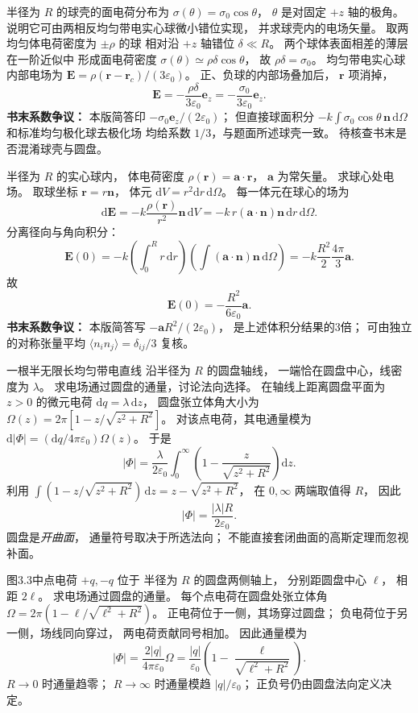 半径为 $R$ 的球壳的面电荷分布为
$\sigma(\theta)=\sigma_0\cos\theta$，
$\theta$ 是对固定 $+z$ 轴的极角。
说明它可由两相反均匀带电实心球微小错位实现，
并求球壳内的电场矢量。
\exsolution
取两均匀体电荷密度为 $\pm\rho$ 的球
相对沿 $+z$ 轴错位 $\delta\ll R$。
两个球体表面相差的薄层在一阶近似中
形成面电荷密度
$\sigma(\theta)\simeq\rho\delta\cos\theta$，
故 $\rho\delta=\sigma_0$。
均匀带电实心球内部电场为
$\bm E=\rho(\bm r-\bm r_c)/(3\varepsilon_0)$。
正、负球的内部场叠加后，
$\bm r$ 项消掉，
\[
\bm E=
-\frac{\rho\delta}{3\varepsilon_0}\bm e_z
=\boxed{-\frac{\sigma_0}{3\varepsilon_0}\bm e_z}.
\]
\excheck \textbf{书末系数争议：}
本版简答印 $-\sigma_0\bm e_z/(2\varepsilon_0)$；
但直接球面积分
$-k\int\sigma_0\cos\theta\,\bm n\,\mathrm d\Omega$
和标准均匀极化球去极化场
均给系数 $1/3$，与题面所述球壳一致。
待核查书末是否混淆球壳与圆盘。

半径为 $R$ 的实心球内，
体电荷密度
$\rho(\bm r)=\bm a\cdot\bm r$，
$\bm a$ 为常矢量。
求球心处电场。
\exsolution
取球坐标
$\bm r=r\bm n$，
体元
$\mathrm dV=r^2\mathrm dr\,\mathrm d\Omega$。
每一体元在球心的场为
\[
\mathrm d\bm E
=-k\frac{\rho(\bm r)}{r^2}\bm n\,\mathrm dV
=-k\,r(\bm a\cdot\bm n)\bm n\,
\mathrm dr\,\mathrm d\Omega.
\]
分离径向与角向积分：
\[
\bm E(0)
=-k\left(\int_0^Rr\,\mathrm dr\right)
\left(\int(\bm a\cdot\bm n)\bm n\,\mathrm d\Omega\right)
=-k\frac{R^2}{2}\frac{4\pi}{3}\bm a.
\]
故
\[
\boxed{\bm E(0)=
-\frac{R^2}{6\varepsilon_0}\bm a}.
\]
\excheck \textbf{书末系数争议：}
本版简答写 $-\bm aR^2/(2\varepsilon_0)$，
是上述体积分结果的3倍；
可由独立的对称张量平均
$\langle n_i n_j\rangle=\delta_{ij}/3$ 复核。

一根半无限长均匀带电直线
沿半径为 $R$ 的圆盘轴线，
一端恰在圆盘中心，线密度为 $\lambda$。
求电场通过圆盘的通量，讨论法向选择。
\exsolution
在轴线上距离圆盘平面为 $z>0$ 的微元电荷
$\mathrm dq=\lambda\,\mathrm dz$，
圆盘张立体角大小为
$\Omega(z)=2\pi[1-z/\sqrt{z^2+R^2}]$。
对该点电荷，其电通量模为
$\mathrm d|\Phi|=(\mathrm dq/4\pi\varepsilon_0)\Omega(z)$。
于是
\[
|\Phi|=\frac{\lambda}{2\varepsilon_0}
\int_0^\infty
\left(1-\frac z{\sqrt{z^2+R^2}}\right)\mathrm dz.
\]
利用
$\int(1-z/\sqrt{z^2+R^2})\,\mathrm dz
=z-\sqrt{z^2+R^2}$，
在 $0,\infty$ 两端取值得 $R$，
因此
\[
\boxed{|\Phi|=\frac{|\lambda|R}{2\varepsilon_0}}.
\]
\excheck 圆盘是\emph{开曲面}，
通量符号取决于所选法向；
不能直接套闭曲面的高斯定理而忽视补面。

图3.3中点电荷 $+q,-q$ 位于
半径为 $R$ 的圆盘两侧轴上，
分别距圆盘中心 $\ell$，
相距 $2\ell$。
求电场通过圆盘的通量。
\exsolution
每个点电荷在圆盘处张立体角
$\Omega=2\pi(1-\ell/\sqrt{\ell^2+R^2})$。
正电荷位于一侧，其场穿过圆盘；
负电荷位于另一侧，场线同向穿过，
两电荷贡献同号相加。
因此通量模为
\[
|\Phi|=\frac{2|q|}{4\pi\varepsilon_0}\Omega
=\boxed{\frac{|q|}{\varepsilon_0}
\left(1-\frac{\ell}{\sqrt{\ell^2+R^2}}\right)}.
\]
\excheck $R\to0$ 时通量趋零；
$R\to\infty$ 时通量模趋 $|q|/\varepsilon_0$；
正负号仍由圆盘法向定义决定。

